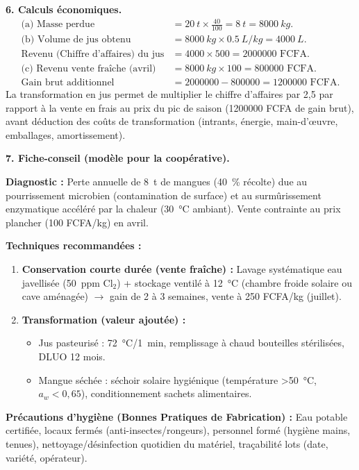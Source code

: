 \documentclass[11pt]{article}
\begin{document}
\begin{exoresolu}
\textbf{6. Calculs économiques.}
\begin{align*}
\text{(a) Masse perdue} &= \SI{20}{t} \times \frac{40}{100} = \SI{8}{t} = \SI{8000}{kg}.\\
\text{(b) Volume de jus obtenu} &= \SI{8000}{kg} \times \SI{0,5}{L/kg} = \SI{4000}{L}.\\
\text{Revenu (Chiffre d'affaires) du jus} &= \num{4000} \times \num{500} = \num{2000000} \text{ FCFA}.\\
\text{(c) Revenu vente fraîche (avril)} &= \SI{8000}{kg} \times \num{100} = \num{800000} \text{ FCFA}.\\
\text{Gain brut additionnel} &= \num{2000000} - \num{800000} = \num{1200000} \text{ FCFA}.
\end{align*}
La transformation en jus permet de multiplier le chiffre d'affaires par 2,5 par rapport à la vente en frais au prix du pic de saison (\num{1200000} FCFA de gain brut), avant déduction des coûts de transformation (intrants, énergie, main-d'œuvre, emballages, amortissement).

\textbf{7. Fiche-conseil (modèle pour la coopérative).}

\textbf{Diagnostic :} Perte annuelle de \SI{8}{t} de mangues (\SI{40}{\%} récolte) due au pourrissement microbien (contamination de surface) et au surmûrissement enzymatique accéléré par la chaleur (\SI{30}{\celsius} ambiant). Vente contrainte au prix plancher (\num{100} FCFA/kg) en avril.

\textbf{Techniques recommandées :}
\begin{enumerate}
\item \textbf{Conservation courte durée (vente fraîche) :} Lavage systématique eau javellisée (\SI{50}{ppm} Cl$_2$) + stockage ventilé à \SI{12}{\celsius} (chambre froide solaire ou cave aménagée) $\rightarrow$ gain de 2 à 3 semaines, vente à \num{250} FCFA/kg (juillet).
\item \textbf{Transformation (valeur ajoutée) :}
      \begin{itemize}
      \item Jus pasteurisé : \SI{72}{\celsius}/\SI{1}{min}, remplissage à chaud bouteilles stérilisées, DLUO 12 mois.
      \item Mangue séchée : séchoir solaire hygiénique (température \textgreater \SI{50}{\celsius}, $a_w < 0,65$), conditionnement sachets alimentaires.
      \end{itemize}
\end{enumerate}

\textbf{Précautions d'hygiène (Bonnes Pratiques de Fabrication) :} Eau potable certifiée, locaux fermés (anti-insectes/rongeurs), personnel formé (hygiène mains, tenues), nettoyage/désinfection quotidien du matériel, traçabilité lots (date, variété, opérateur).


\end{exoresolu}
\end{document}
